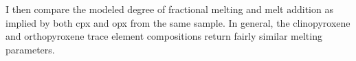 \documentclass[11pt]{article}
\begin{document}
    \begin{center}
    \end{center}
    { \hspace*{\fill} \\}
    
    \begin{center}
    \end{center}
    { \hspace*{\fill} \\}
    
    I then compare the modeled degree of fractional melting and melt
addition as implied by both cpx and opx from the same sample. In
general, the clinopyroxene and orthopyroxene trace element compositions
return fairly similar melting parameters.
\end{document}

